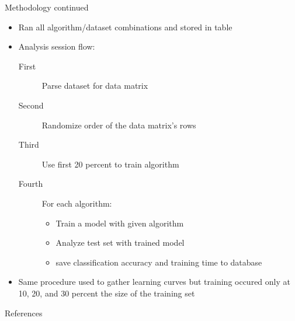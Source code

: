 \documentclass{beamer}
\begin{document}
\begin{frame}{Methodology continued}
  \begin{itemize}
     \item Ran all algorithm/dataset combinations and stored in table
     \item Analysis session flow:
       \begin{description}
         \item[First] Parse dataset for data matrix
         \item[Second] Randomize order of the data matrix's rows
         \item[Third] Use first 20 percent to train algorithm
         \item[Fourth] For each algorithm:
           \begin{itemize}
              \item Train a model with given algorithm
              \item Analyze test set with trained model
              \item save classification accuracy and training time to
                    database
           \end{itemize}
       \end{description}
     \item Same procedure used to gather learning curves but training
           occured only at 10, 20, and 30 percent the size of the training
           set
  \end{itemize}
\end{frame}

\begin{frame}{References}
	\nocite{*} %
\end{frame}
\end{document}
